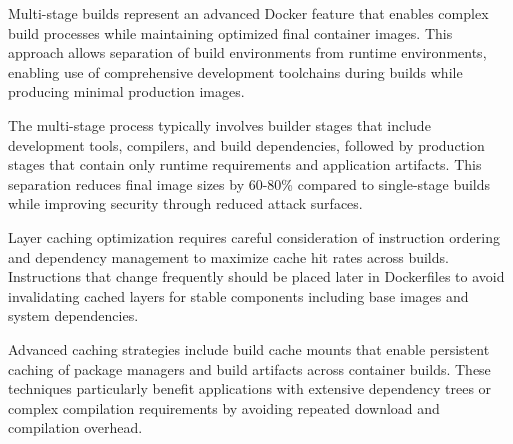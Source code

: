 Multi-stage builds represent an advanced Docker feature that enables complex build processes while maintaining optimized final container images. This approach allows separation of build environments from runtime environments, enabling use of comprehensive development toolchains during builds while producing minimal production images.

The multi-stage process typically involves builder stages that include development tools, compilers, and build dependencies, followed by production stages that contain only runtime requirements and application artifacts. This separation reduces final image sizes by 60-80\% compared to single-stage builds while improving security through reduced attack surfaces.

Layer caching optimization requires careful consideration of instruction ordering and dependency management to maximize cache hit rates across builds. Instructions that change frequently should be placed later in Dockerfiles to avoid invalidating cached layers for stable components including base images and system dependencies.

Advanced caching strategies include build cache mounts that enable persistent caching of package managers and build artifacts across container builds. These techniques particularly benefit applications with extensive dependency trees or complex compilation requirements by avoiding repeated download and compilation overhead.